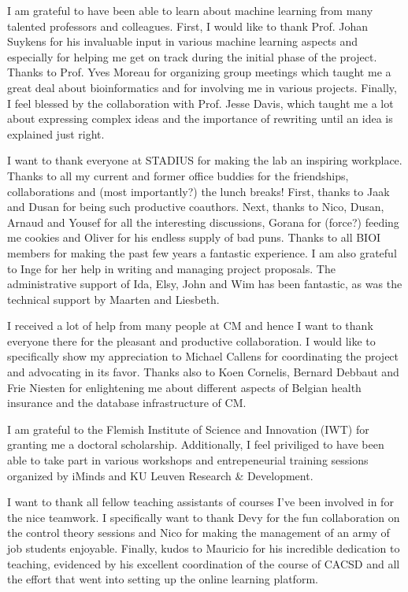 I am grateful to have been able to learn about machine learning from many talented professors and colleagues. First, I would like to thank Prof. Johan Suykens for his invaluable input in various machine learning aspects and especially for helping me get on track during the initial phase of the project. Thanks to Prof. Yves Moreau for organizing group meetings which taught me a great deal about bioinformatics and for involving me in various projects. Finally, I feel blessed by the collaboration with Prof. Jesse Davis, which taught me a lot about expressing complex ideas and the importance of rewriting until an idea is explained just right.

I want to thank everyone at STADIUS for making the lab an inspiring workplace. Thanks to all my current and former office buddies for the friendships, collaborations and (most importantly?) the lunch breaks! First, thanks to Jaak and Dusan for being such productive coauthors. Next, thanks to Nico, Dusan, Arnaud and Yousef for all the interesting discussions, Gorana for (force?) feeding me cookies and Oliver for his endless supply of bad puns. Thanks to all BIOI members for making the past few years a fantastic experience. I am also grateful to Inge for her help in writing and managing project proposals. The administrative support of Ida, Elsy, John and Wim has been fantastic, as was the technical support by Maarten and Liesbeth.

I received a lot of help from many people at CM and hence I want to thank everyone there for the pleasant and productive collaboration. I would like to specifically show my appreciation to Michael Callens for coordinating the project and advocating in its favor. Thanks also to Koen Cornelis, Bernard Debbaut and Frie Niesten for enlightening me about different aspects of Belgian health insurance and the database infrastructure of CM.

I am grateful to the Flemish Institute of Science and Innovation (IWT) for granting me a doctoral scholarship. Additionally, I feel priviliged to have been able to take part in various workshops and entrepeneurial training sessions organized by iMinds and KU Leuven Research \& Development.

I want to thank all fellow teaching assistants of courses I've been involved in for the nice teamwork. I specifically want to thank Devy for the fun collaboration on the control theory sessions and Nico for making the management of an army of job students enjoyable. Finally, kudos to Mauricio for his incredible dedication to teaching, evidenced by his excellent coordination of the course of CACSD and all the effort that went into setting up the online learning platform.

